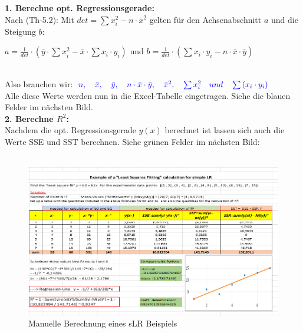 \documentclass[12pt]{article}
\begin{document}
\textbf{1. Berechne opt. Regressionsgerade:}\\[0.2cm]   
Nach (Th-5.2): Mit $ det = \sum{x_i^2} - n \cdot \bar{x}^2 $ gelten für den Achsenabschnitt $a$ und die Steigung $b$:\\[0.2cm]
\begin{large}
$ a = \frac{1}{det} \cdot (\bar{y} \cdot \sum{x_i^2} - \bar{x} \cdot \sum{x_i \cdot y_i}) $ und $ b = \frac{1}{det} \cdot (\sum {x_i \cdot y_i} - n \cdot \bar{x} \cdot \bar{y})$   \\[0.2cm]
\end{large} \\[0.2cm]
Also brauchen wir: ${\color{blue}{ n, \quad \bar{x}, \quad \bar{y}, \quad n \cdot \bar{x} \cdot \bar{y}, \quad \bar{x}^2, \quad \sum{x_i^2} \quad und \quad \sum{(x_i \cdot y_i)}}}$
\\[0.2cm]
Alle diese Werte werden nun in die Excel-Tabelle eingetragen. Siehe die blauen Felder im nächsten Bild.\\[0.1cm]

\textbf{2. Berechne $R^2$:}\\[0.2cm]
Nachdem die opt. Regressionsgerade $y(x)$ berechnet ist lassen sich auch die  Werte SSE und SST berechnen. Siehe grünen Felder im nächsten Bild:\\
\\[1.5cm]

\begin{figure}[htp]
  \centering
  \hspace*{-0.9cm} 
  \includegraphics[width=1.25 \textwidth]{Einfaches-sLR_Beispiel}
  \caption{Manuelle Berechnung eines sLR Beispiels}
  \label{fig:einfaches-sLR-Bsp}
\end{figure}
%
\newpage
\end{document}
